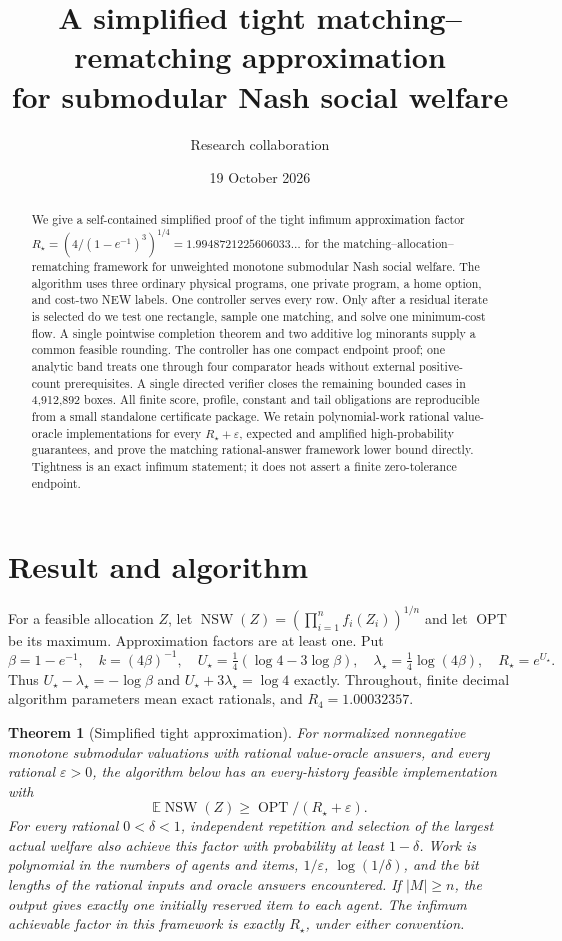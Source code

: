 \documentclass[10pt]{article}
\title{A simplified tight matching--rematching approximation\\for submodular Nash social welfare}
\author{Research collaboration}\date{19 October 2026}
\newtheorem{theorem}{Theorem}[section]
\DeclareMathOperator{\OPT}{OPT}
\DeclareMathOperator{\NSW}{NSW}
\begin{document}
\maketitle
\begin{abstract}
We give a self-contained simplified proof of the tight infimum approximation
factor $R_\star=(4/(1-e^{-1})^3)^{1/4}=1.9948721225606033\ldots$ for the
matching--allocation--rematching framework for unweighted monotone
submodular Nash social welfare. The algorithm uses three ordinary physical
programs, one private program, a home option, and cost-two NEW labels.
One controller serves every row. Only after a residual iterate is selected
do we test one rectangle, sample one matching, and solve one minimum-cost
flow. A single pointwise completion theorem and two additive log minorants
supply a common feasible rounding. The controller has one compact endpoint
proof; one analytic band treats one through four comparator heads without
external positive-count prerequisites. A single directed verifier closes
the remaining bounded cases in 4,912,892 boxes. All finite score, profile,
constant and tail obligations are reproducible from a small standalone
certificate package. We retain polynomial-work rational value-oracle
implementations for every $R_\star+\varepsilon$, expected and amplified
high-probability guarantees, and prove the matching rational-answer
framework lower bound directly. Tightness is an exact infimum statement;
it does not assert a finite zero-tolerance endpoint.
\end{abstract}
\tableofcontents
\section{Result and algorithm}
For a feasible allocation $Z$, let
$\NSW(Z)=(\prod_{i=1}^nf_i(Z_i))^{1/n}$ and let $\OPT$ be its maximum.
Approximation factors are at least one. Put
\[
 \beta=1-e^{-1},\quad k=(4\beta)^{-1},\quad
 U_\star=\tfrac14(\log4-3\log\beta),\quad
 \lambda_\star=\tfrac14\log(4\beta),\quad R_\star=e^{U_\star}.
\]
Thus $U_\star-\lambda_\star=-\log\beta$ and
$U_\star+3\lambda_\star=\log4$ exactly. Throughout, finite decimal
algorithm parameters mean exact rationals, and $R_4=1.00032357$.

\begin{theorem}[Simplified tight approximation]\label{simp:main-theorem}
For normalized nonnegative monotone submodular valuations with rational
value-oracle answers, and every rational $\varepsilon>0$, the algorithm
below has an every-history feasible implementation with
\[
 \mathbb E\NSW(Z)\ge\OPT/(R_\star+\varepsilon).
\]
For every rational $0<\delta<1$, independent repetition and selection of
the largest actual welfare also achieve this factor with probability at
least $1-\delta$. Work is polynomial in the numbers of agents and items,
$1/\varepsilon$, $\log(1/\delta)$, and the bit lengths of the rational
inputs and oracle answers encountered. If $|M|\ge n$, the output gives
exactly one initially reserved item to each agent. The infimum achievable
factor in this framework is exactly $R_\star$, under either convention.
\end{theorem}
\end{document}
